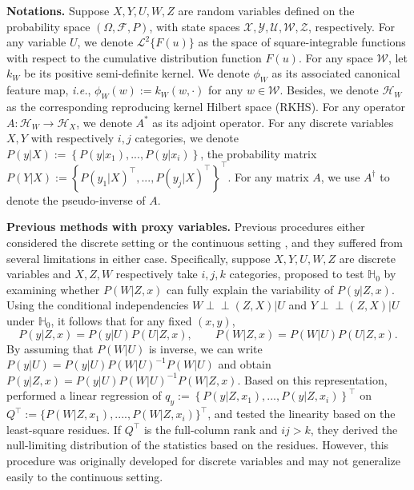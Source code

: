 \documentclass[
  12pt]{article}
\def\to{\rightarrow}
\newcommand{\ind}{\perp\!\!\!\!\perp}
\def\mH{\mathbb{H}}
\def\cH{\mathcal{H}}
\def\cW{\mathcal{W}}
\begin{document}
\textbf{Notations.} Suppose $X, Y, U, W, Z$ are random variables defined on the probability space $(\Omega,\mathcal{F},P)$, with state spaces $\mathcal{X}, \mathcal{Y}, \mathcal{U}, \mathcal{W}, \mathcal{Z}$, respectively. For any variable $U$, we denote $\mathcal{L}^2\{F(u)\}$ as the space of square-integrable functions with respect to the cumulative distribution function $F(u)$. For any space $\cW$, let $k_W$ be its positive semi-definite kernel. We denote $\phi_W$ as its associated canonical feature map, \emph{i.e.}, $\phi_W(w):=k_W(w,\cdot)$ for any $w \in \cW$. Besides, we denote $\cH_W$ as the corresponding reproducing kernel Hilbert space (RKHS). For any operator $A:\cH_W \to\cH_X$, we denote $A^*$ as its adjoint operator. For any discrete variables $X,Y$ with respectively $i,j$ categories, we denote $P(y|X):=\left\{P(y|x_1),...,P(y|x_i) \right\}$, the probability matrix $P(Y|X) := \left\{P(y_1|X)^\top,...,P(y_j|X)^\top\right\}^\top$. For any matrix $A$, we use $A^\dagger$ to denote the pseudo-inverse of $A$.  


\textbf{Previous methods with proxy variables.} Previous procedures either considered the discrete setting \citep{miao2018identifying} or the continuous setting \citep{miao2023identifying, liu2023causal}, and they suffered from several limitations in either case. Specifically, suppose $X, Y, U, W, Z$ are
discrete variables and $X,Z,W$ respectively take $i,j,k$ categories, \citet{miao2018identifying} proposed to test $\mH_0$ by examining whether $P(W|Z,x)$ can fully explain the variability of $P(y|Z,x)$. Using the conditional independencies $W\ind (Z,X)|U$ and $Y\ind (Z,X)|U$ under $\mH_0$, it follows that for any fixed $(x,y)$,
$$
P(y|Z,x)=P(y|U)P(U|Z,x), \qquad P(W|Z,x)=P(W|U)P(U|Z,x). 
$$
By assuming that $P(W|U)$ is inverse, we can write $P(y|U)=P(y|U)P(W|U)^{-1}P(W|U)$ and obtain
$
P(y|Z,x)=P(y|U)P(W|U)^{-1}P(W|Z,x).
$
Based on this representation, \cite{miao2018identifying} performed a linear regression of $q_y:=\left\{P(y|Z,x_1),...,P(y|Z,x_i)\right\}^\top$ on $Q^\top:=\{P(W|Z,x_1),....,P(W|Z,x_i)\}^\top$, and tested the linearity based on the least-square residues. If $Q^\top$ is the full-column rank and $ij > k$, they derived the null-limiting distribution of the statistics based on the residues. However, this procedure was originally developed for discrete variables and may not generalize easily to the continuous setting. 
\end{document}
